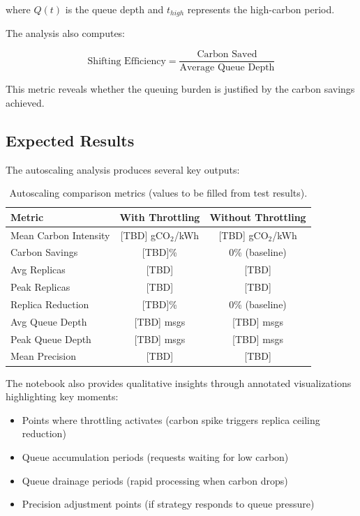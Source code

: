 where $Q(t)$ is the queue depth and $t_{high}$ represents the high-carbon period.

The analysis also computes:

\begin{equation}
    \text{Shifting Efficiency} = \frac{\text{Carbon Saved}}{\text{Average Queue Depth}}
\end{equation}

This metric reveals whether the queuing burden is justified by the carbon savings achieved.

\subsection{Expected Results}

The autoscaling analysis produces several key outputs:

\begin{table}[h]
\centering
\begin{tabular}{|l|c|c|}
\hline
\rowcolor{lightgray}
\textbf{Metric} & \textbf{With Throttling} & \textbf{Without Throttling} \\
\hline
Mean Carbon Intensity & [TBD] gCO$_2$/kWh & [TBD] gCO$_2$/kWh \\
\hline
Carbon Savings & [TBD]\% & 0\% (baseline) \\
\hline
Avg Replicas & [TBD] & [TBD] \\
\hline
Peak Replicas & [TBD] & [TBD] \\
\hline
Replica Reduction & [TBD]\% & 0\% (baseline) \\
\hline
Avg Queue Depth & [TBD] msgs & [TBD] msgs \\
\hline
Peak Queue Depth & [TBD] msgs & [TBD] msgs \\
\hline
Mean Precision & [TBD] & [TBD] \\
\hline
\end{tabular}
\caption{Autoscaling comparison metrics (values to be filled from test results).}
\label{table:autoscaling-comparison}
\end{table}

The notebook also provides qualitative insights through annotated visualizations highlighting key moments:

\begin{itemize}
    \item Points where throttling activates (carbon spike triggers replica ceiling reduction)
    \item Queue accumulation periods (requests waiting for low carbon)
    \item Queue drainage periods (rapid processing when carbon drops)
    \item Precision adjustment points (if strategy responds to queue pressure)
\end{itemize}

